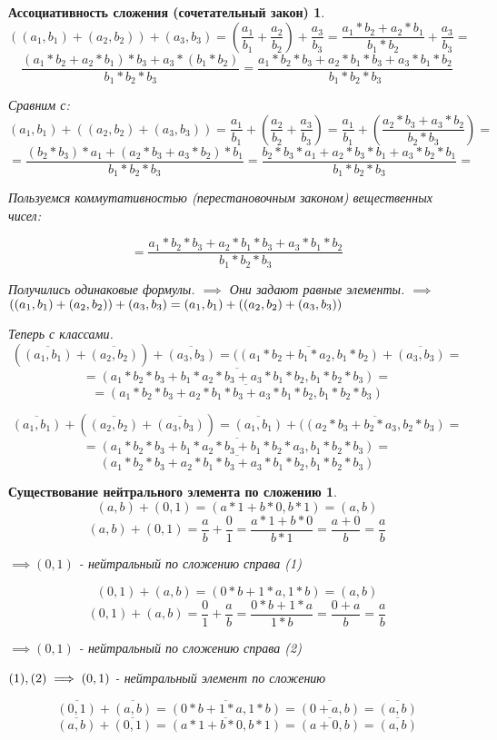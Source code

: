 \documentclass[14pt,a4paper,oneside,russian]{article}
\newtheorem*{axiom1}{Ассоциативность сложения (сочетательный закон)}
\newtheorem*{axiom2}{Существование нейтрального элемента по сложению}
\begin{document}
\begin{axiom1}
$$
((a_1, b_1) + (a_2, b_2)) + (a_3, b_3) =
(\frac{a_1}{b_1} + \frac{a_2}{b_2}) + \frac{a_3}{b_3} =
\frac{a_1 * b_2 + a_2 * b_1}{b_1 * b_2} + \frac{a_3}{b_3} =
$$
$$
\frac{(a_1 * b_2 + a_2 * b_1) * b_3 + a_3 * (b_1 * b_2)}{b_1 * b_2 * b_3} =
\frac{a_1 * b_2 * b_3 + a_2 * b_1 * b_3 + a_3 * b_1 * b_2}{b_1 * b_2 * b_3}
$$

Сравним с:
$$
( a_1, b_1 ) + (( a_2, b_2 ) + ( a_3, b_3 )) =
\frac{a_1}{b_1} + (\frac{a_2}{b_2} + \frac{a_3}{b_3}) =
\frac{a_1}{b_1} + (\frac{a_2 * b_3 + a_3 * b_2}{b_2 * b_3}) =
$$
$$
= \frac{(b_2 * b_3) * a_1 + (a_2 * b_3 + a_3 * b_2) * b_1}{b_1 * b_2 * b_3} =
\frac{b_2 * b_3 * a_1 + a_2 * b_3 * b_1 + a_3 * b_2 * b_1}{b_1 * b_2 * b_3} =
$$

Пользуемся коммутативностью (перестановочным законом) вещественных чисел:

$$
= \frac{a_1 * b_2 * b_3 + a_2 * b_1 * b_3 + a_3 * b_1 * b_2}{b_1 * b_2 * b_3}
$$

Получились одинаковые формулы.
$ \implies $
Они задают равные элементы.
$ \implies $
$
((a_1, b_1) + (a_2, b_2)) + (a_3, b_3) =
(a_1, b_1) + ((a_2, b_2) + (a_3, b_3))
\newline
$

Теперь с классами.
$$
(\overline{(a_1, b_1)} + \overline{(a_2, b_2)}) + \overline{(a_3, b_3)} =
(\overline{(a_1 * b_2 + b_1 * a_2, b_1 * b_2)} + \overline{(a_3, b_3)} =
$$
$$
=\overline{(a_1 * b_2 * b_3 + b_1 * a_2 * b_3 + a_3 * b_1 * b_2,
b_1 * b_2 * b_3)} =
$$
$$
= \overline{(a_1 * b_2 * b_3 + a_2 * b_1 * b_3 + a_3 * b_1 * b_2,
b_1 * b_2 * b_3)}
$$

$$
\overline{(a_1, b_1)} + (\overline{(a_2, b_2)} + \overline{(a_3, b_3)}) =
\overline{(a_1, b_1)} + (\overline{(a_2 * b_3 + b_2 * a_3, b_2 * b_3)} =
$$
$$
= \overline{(a_1 * b_2 * b_3 + b_1 * a_2 * b_3 + b_1 * b_2 * a_3,
b_1 * b_2 * b_3)} =
$$
$$
\overline{(a_1 * b_2 * b_3 + a_2 * b_1 * b_3 + a_3 * b_1 * b_2,
b_1 * b_2 * b_3)}
$$
\end{axiom1}
\newpage

\begin{axiom2}
$$ (a, b) + (0, 1) = (a * 1 + b * 0, b * 1) = (a, b) $$
$$
(a, b) + (0, 1) =
\frac{a}{b} + \frac{0}{1} =
\frac{a * 1 + b * 0}{b * 1} =
\frac{a + 0}{b} =
\frac{a}{b}
$$

$ \implies (0, 1) $ - нейтральный по сложению справа (1)

$$ (0, 1) + (a, b) = (0 * b + 1 * a, 1 * b) = (a, b) $$
$$
(0, 1) + (a, b) =
\frac{0}{1} + \frac{a}{b} =
\frac{0 * b + 1 * a}{1 * b} =
\frac{0 + a}{b} =
\frac{a}{b}
$$

$ \implies (0, 1) $ - нейтральный по сложению справа (2)

$ \newline (1), (2) \implies (0, 1) $ - нейтральный элемент по сложению

$$
\overline{(0, 1)} + \overline{(a, b)} =
\overline{(0 * b + 1 * a, 1 * b)} =
\overline{(0 + a, b)} =
\overline{(a, b)}
$$
$$
\overline{(a, b)} + \overline{(0, 1)} =
\overline{(a * 1 + b * 0, b * 1)} =
\overline{(a + 0, b)} =
\overline{(a, b)}
$$

\end{axiom2}
\newpage
\end{document}
